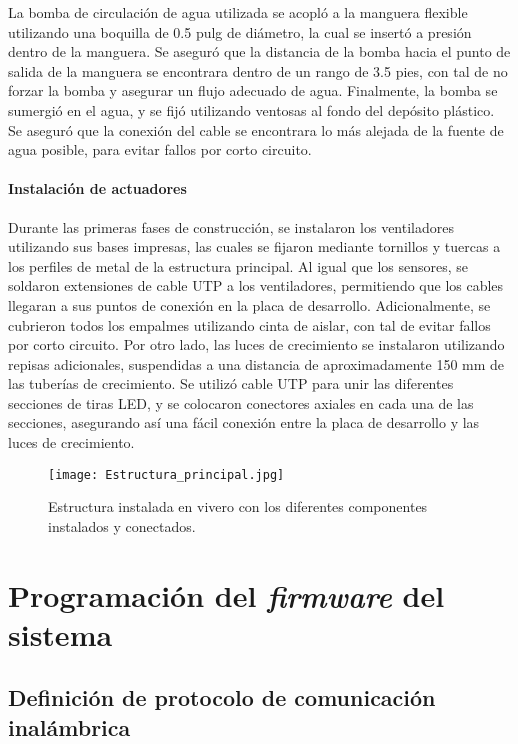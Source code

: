 La bomba de circulación de agua utilizada se acopló a la manguera flexible utilizando una boquilla de 0.5 pulg de diámetro, la cual se insertó a presión dentro de la manguera. Se aseguró que la distancia de la bomba hacia el punto de salida de la manguera se encontrara dentro de un rango de 3.5 pies, con tal de no forzar la bomba y asegurar un flujo adecuado de agua. Finalmente, la bomba se sumergió en el agua, y se fijó utilizando ventosas al fondo del depósito plástico. Se aseguró que la conexión del cable se encontrara lo más alejada de la fuente de agua posible, para evitar fallos por corto circuito.

\subsubsection{Instalación de actuadores}

Durante las primeras fases de construcción, se instalaron los ventiladores utilizando sus bases impresas, las cuales se fijaron mediante tornillos y tuercas a los perfiles de metal de la estructura principal. Al igual que los sensores, se soldaron extensiones de cable UTP a los ventiladores, permitiendo que los cables llegaran a sus puntos de conexión en la placa de desarrollo. Adicionalmente, se cubrieron todos los empalmes utilizando cinta de aislar, con tal de evitar fallos por corto circuito. Por otro lado, las luces de crecimiento se instalaron utilizando repisas adicionales, suspendidas a una distancia de aproximadamente 150 mm de las tuberías de crecimiento. Se utilizó cable UTP para unir las diferentes secciones de tiras LED, y se colocaron conectores axiales en cada una de las secciones, asegurando así una fácil conexión entre la placa de desarrollo y las luces de crecimiento.

\begin{figure}[H]
	\centering
	\texttt{[image: Estructura\_principal.jpg]}
	\caption{Estructura instalada en vivero con los diferentes componentes instalados y conectados.}
	\label{fig:estructura_final}
\end{figure}


\chapter{Programación del \textit{firmware} del sistema}

\section{Definición de protocolo de comunicación inalámbrica}


